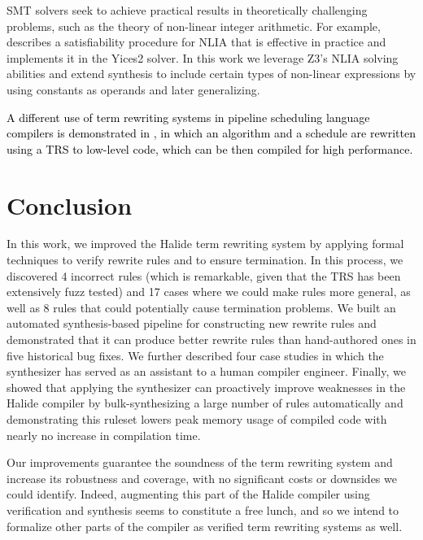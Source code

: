 \documentclass[acmsmall]{acmart}\settopmatter{}
\newcommand{\modified}[1]{\textcolor{black}{{#1}}}
\newcommand{\NumRulesFixed}{{\color{black} 4}\xspace}
\newcommand{\NumPredicatesRelaxed}{{\color{black} 17}\xspace}
\newcommand{\NumOrderingProblems}{{\color{black} 8}\xspace}
\newcommand{\NumRulesSynthesized}{{\color{black} 4127}\xspace}
\begin{document}
SMT solvers seek to achieve practical results in theoretically challenging problems, such as the theory of non-linear integer arithmetic. For example, \citet{jovanovic2017solving} describes a satisfiability procedure for NLIA that is effective in practice and implements it in the Yices2 solver. In this work we leverage Z3's NLIA solving abilities and extend synthesis to include certain types of non-linear expressions by using constants as operands and later generalizing.

\modified{A different use of term rewriting systems in pipeline scheduling language
compilers is demonstrated in \cite{hagedorn2020achieving}, in which an algorithm
and a schedule are rewritten using a TRS to low-level code, which can be then compiled
for high performance.}

\section{Conclusion}
\label{sec:conclusion}
In this work, we improved the Halide term rewriting system by applying formal
techniques to verify rewrite rules and to ensure termination.  In this process,
we discovered \NumRulesFixed incorrect rules (which is remarkable,
given that the TRS has been extensively fuzz tested) and \NumPredicatesRelaxed cases
where we could make rules more general, as well as \NumOrderingProblems rules
that could potentially cause termination problems.  We built
an automated synthesis-based pipeline for constructing new rewrite rules
and demonstrated that it can produce better rewrite rules than hand-authored ones
in five historical bug fixes. We further described four case studies in which the
synthesizer has served as an assistant to a human compiler engineer. Finally,
we showed that applying the synthesizer can proactively improve weaknesses
in the Halide compiler by bulk-synthesizing a large number of rules automatically
and demonstrating this ruleset lowers peak memory usage of compiled code with nearly
no increase in compilation time.

Our improvements guarantee the soundness of the term rewriting system
and increase its robustness and coverage, with no significant costs or
downsides we could identify. Indeed, augmenting this part of the
Halide compiler using verification and synthesis seems to constitute a
free lunch, and so we intend to formalize other parts of the compiler as
verified term rewriting systems as well.
\end{document}
